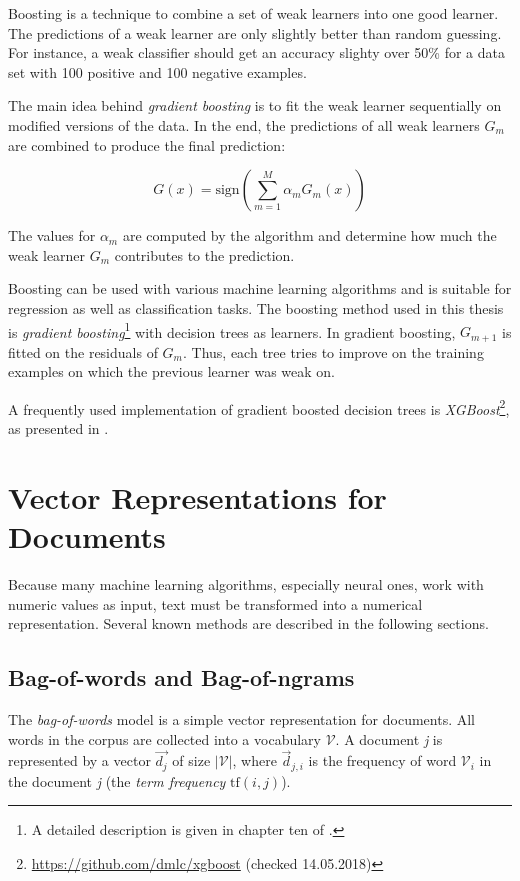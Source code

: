 Boosting is a technique to combine a set of weak learners into one good learner. The predictions of a weak learner are only slightly better than random guessing. For instance, a weak classifier should get an accuracy slighty over 50\% for a data set with 100 positive and 100 negative examples.

The main idea behind \emph{gradient boosting} is to fit the weak learner sequentially on modified versions of the data. In the end, the predictions of all weak learners \emph{$G_m$} are combined to produce the final prediction:

\[G(x) = \text{sign}\left(\sum^M_{m=1} \alpha_m G_m(x)\right) \]

The values for $\alpha_m$ are computed by the algorithm and determine how much the weak learner \emph{$G_m$} contributes to the prediction.

Boosting can be used with various machine learning algorithms and is suitable for regression as well as classification tasks. The boosting method used in this thesis is \emph{gradient boosting}\footnote{A detailed description is given in chapter ten of \cite{friedman2001elements}.} with decision trees as learners. In gradient boosting, \emph{$G_{m+1}$} is fitted on the residuals of \emph{$G_m$}. Thus, each tree tries to improve on the training examples on which the previous learner was weak on.

A frequently used implementation of gradient boosted decision trees is \emph{XGBoost}\footnote{\url{https://github.com/dmlc/xgboost} (checked 14.05.2018)}, as presented in \cite{DBLP:journals/corr/ChenG16}.



\section{Vector Representations for Documents}
Because many machine learning algorithms, especially neural ones, work with numeric values as input, text must be transformed into a numerical representation. Several known methods are described in the following sections.
\subsection{Bag-of-words and Bag-of-ngrams}
The \emph{bag-of-words} model is a simple vector representation for documents. All words in the corpus are collected into a vocabulary $\mathcal{V}$. A document  \emph{j} is represented by a vector $\vec{d_j}$ of size $|\mathcal{V}|$, where $\vec{d}_{j,i}$ is the frequency of word $\mathcal{V}_i$ in the document \emph{j} (the \emph{term frequency} $\text{tf}(i,j)$).

